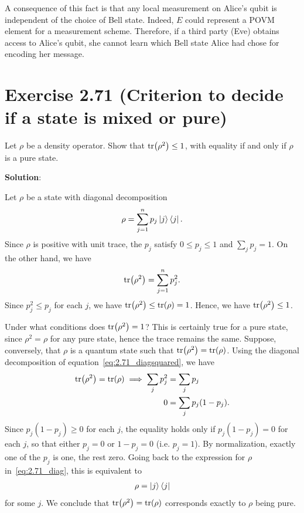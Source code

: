 \documentclass{book}
\begin{document}
    A consequence of this fact is that any local measurement on Alice's qubit is independent of the choice of Bell state. Indeed, $E$ could represent a POVM element for a measurement scheme. Therefore, if a third party (Eve) obtains access to Alice's qubit, she cannot learn which Bell state Alice had chose for encoding her message.

\section*{Exercise 2.71 (Criterion to decide if a state is mixed or pure)}
    Let $\rho$ be a density operator. Show that $\tr(\rho^2) \leq  1$, with equality if and only if $\rho$ is a pure state.

    \textbf{Solution}: 
    
    Let $\rho$ be a state with diagonal decomposition
    \begin{align} \label{eq:2.71_diag}
        \rho = \sum_{j = 1}^n p_j \ket{j}\bra{j}.
    \end{align}
    Since $\rho$ is positive with unit trace, the $p_j$ satisfy $0 \leq p_j \leq 1$ and $\sum_j p_j = 1$. On the other hand, we have
    \begin{align} \label{eq:2.71_diagsquared}
        \tr(\rho^2) = \sum_{j=1}^n p_j^2.
    \end{align}
    Since $p_j^2 \leq p_j$ for each $j$, we have $\tr(\rho^2) \leq \tr(\rho) = 1$. Hence, we have $\tr(\rho^2) \leq 1$. 
    
    Under what conditions does $\tr(\rho^2) = 1$? This is certainly true for a pure state, since $\rho^2 = \rho$ for any pure state, hence the trace remains the same. Suppose, conversely, that $\rho$ is a quantum state such that $\tr(\rho^2) = \tr(\rho)$. Using the diagonal decomposition of equation~\eqref{eq:2.71_diagsquared}, we have
    \begin{align}
    \begin{aligned}
        \tr(\rho^2) = \tr(\rho) \implies \sum_{j} p_j^2 &= \sum_j p_j \\
        0 &= \sum_j p_j(1-p_j).
    \end{aligned}
    \end{align}
    Since $p_j(1-p_j) \geq 0$ for each $j$, the equality holds only if $p_j(1-p_j) = 0$ for each $j$, so that either $p_j = 0$ or $1-p_j = 0$ (i.e. $p_j = 1$). By normalization, exactly one of the $p_j$ is one, the rest zero. Going back to the expression for $\rho$ in~\eqref{eq:2.71_diag}, this is equivalent to
    \begin{align}
        \rho = \ket{j}\bra{j}
    \end{align}
    for some $j$. We conclude that $\tr(\rho^2) = \tr(\rho)$ corresponds exactly to $\rho$ being pure.
\end{document}
